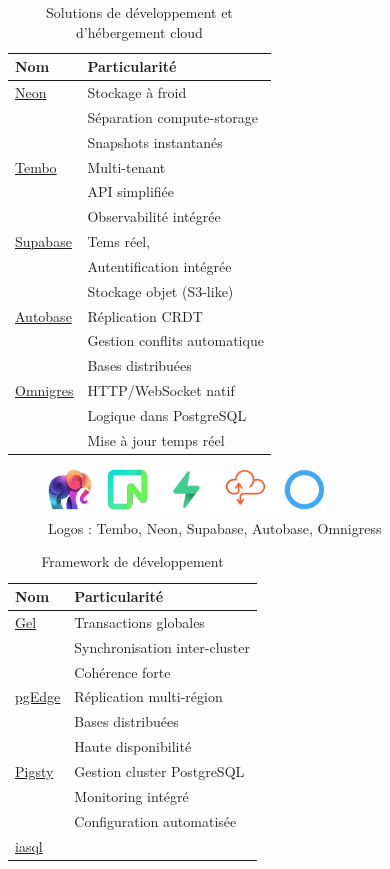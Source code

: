\documentclass[a4paper,12pt]{article}
\begin{document}
\begin{multicols*}{2}
\begin{table}[H]
\caption{Solutions de développement et d'hébergement cloud}
\centering
\begin{tabular}{ll}
Nom & Particularité\\
\hline
\href{https://github.com/neondatabase/neon}{Neon} & Stockage à froid\\
 & Séparation compute-storage\\
 & Snapshots instantanés\\
\href{https://github.com/tembo-io/tembo}{Tembo} & Multi-tenant\\
 & API simplifiée\\
 & Observabilité intégrée\\
\href{https://github.com/supabase/supabase}{Supabase} & Tems réel,\\
 & Autentification intégrée\\
 & Stockage objet (S3-like)\\
\href{https://github.com/vitabaks/autobase?tab=readme-ov-file}{Autobase} & Réplication CRDT\\
 & Gestion conflits automatique\\
 & Bases distribuées\\
\href{https://github.com/omnigres/omnigres}{Omnigres} & HTTP/WebSocket natif\\
 & Logique dans PostgreSQL\\
 & Mise à jour temps réel\\
\end{tabular}
\end{table}

\begin{figure}[H]
\centering
\includegraphics[height=1.2cm]{icons/pg-cloud.pdf}
\caption{\label{fig:orga776d95}Logos : Tembo, Neon, Supabase, Autobase, Omnigress}
\end{figure}

\begin{table}[H]
\caption{Framework de développement}
\centering
\begin{tabular}{ll}
Nom & Particularité\\
\hline
\href{https://github.com/geldata/gel}{Gel} & Transactions globales\\
 & Synchronisation inter-cluster\\
 & Cohérence forte\\
\href{https://github.com/pgEdge/pgedge}{pgEdge} & Réplication multi-région\\
 & Bases distribuées\\
 & Haute disponibilité\\
\href{https://github.com/Vonng/pigsty}{Pigsty} & Gestion cluster PostgreSQL\\
 & Monitoring intégré\\
 & Configuration automatisée\\
\href{https://github.com/alantech/iasql}{iasql} & \\
\end{tabular}
\end{table}


\end{multicols*}
\end{document}
